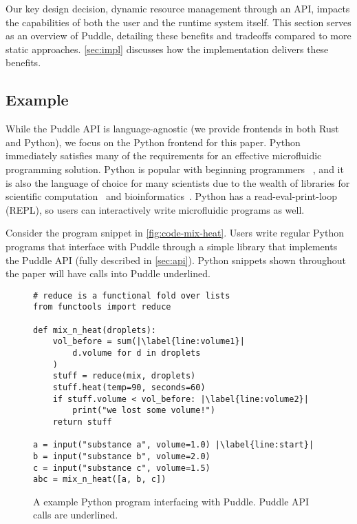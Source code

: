 \documentclass[sigconf, screen]{acmart}
\newcommand\mw[1]{\todo[color=blue!20]{\sf #1}}
\begin{document}
Our key design decision, dynamic resource management through an API, impacts the capabilities of both the user and the runtime system itself.
This section serves as an overview of Puddle, detailing these benefits and tradeoffs compared to more static approaches.
\autoref{sec:impl} discusses how the implementation delivers these benefits.

\subsection{Example}

While the Puddle API is language-agnostic (we provide frontends in both Rust and Python), we focus on the Python frontend for this paper.
Python immediately satisfies many of the requirements for an effective microfluidic programming solution.
Python is popular with beginning programmers ~\cite{python-intro}, and it is also the language of choice for many scientists due to the wealth of libraries for scientific computation~\cite{scipy} and bioinformatics~\cite{biopython}.
Python has a read-eval-print-loop (REPL), so users can interactively write microfluidic programs as well.

Consider the program snippet in \autoref{fig:code-mix-heat}.
Users write regular Python programs that interface with Puddle through a simple library that implements the Puddle API (fully described in \autoref{sec:api}).
Python snippets shown throughout the paper will have calls into Puddle underlined.

\begin{figure}
  \centering
\begin{lstlisting}[emphstyle=\underline, deletekeywords={temperature}]
# reduce is a functional fold over lists
from functools import reduce

def mix_n_heat(droplets):
    vol_before = sum(|\label{line:volume1}|
        d.volume for d in droplets
    )
    stuff = reduce(mix, droplets)
    stuff.heat(temp=90, seconds=60)
    if stuff.volume < vol_before: |\label{line:volume2}|
        print("we lost some volume!")
    return stuff

a = input("substance a", volume=1.0) |\label{line:start}|
b = input("substance b", volume=2.0)
c = input("substance c", volume=1.5)
abc = mix_n_heat([a, b, c])
\end{lstlisting}

  \caption{
    A example Python program interfacing with Puddle.
    Puddle API calls are underlined.
  }
  \label{fig:code-mix-heat}
\end{figure}
\end{document}
